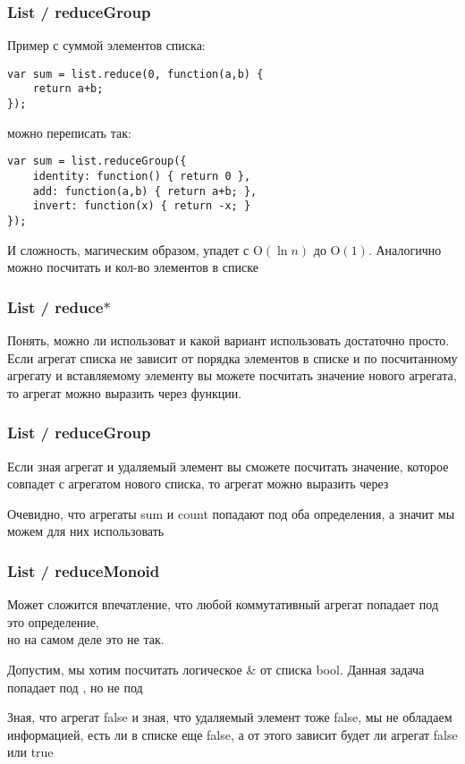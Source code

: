 \documentclass[xetex]{beamer}
\begin{document}
\begin{frame}[fragile]
\frametitle{List / reduceGroup}
Пример с суммой элементов списка:
\begin{lstlisting}[frame=none]
var sum = list.reduce(0, function(a,b) { 
    return a+b; 
});
\end{lstlisting}
можно переписать так:
\begin{lstlisting}[frame=none]
var sum = list.reduceGroup({
    identity: function() { return 0 },
    add: function(a,b) { return a+b; },
    invert: function(x) { return -x; }
});
\end{lstlisting}

\vspace{4mm}
И сложность, магическим образом, упадет с $\mathrm{O}(\ln n)$ до $\mathrm{O}(1)$. Аналогично можно посчитать и кол-во элементов в списке
\end{frame}


\begin{frame}[fragile]
\frametitle{List / reduce$\ast$}
Понять, можно ли использоват \quad и какой вариант использовать достаточно просто. Если агрегат списка не зависит от порядка элементов в списке и по посчитанному агрегату и вставляемому элементу вы можете посчитать значение нового агрегата, то агрегат можно выразить через \quad функции.
\end{frame}


\begin{frame}[fragile]
\frametitle{List / reduceGroup}
Если зная агрегат и удаляемый элемент вы сможете посчитать значение, которое совпадет с агрегатом нового списка, то агрегат можно выразить через 

\vspace{10mm}
Очевидно, что агрегаты sum и count попадают под оба определения, а значит мы можем для них использовать 
\end{frame}


\begin{frame}[fragile]
\frametitle{List / reduceMonoid}
Может сложится впечатление, что любой коммутативный агрегат попадает под это определение, \\ но на самом деле это не так. 

\vspace{6mm}
Допустим, мы хотим посчитать логическое \& от списка bool. Данная задача попадает под \quad, но не под 

\vspace{6mm}
{\color{comments-color} Зная, что агрегат false и зная, что удаляемый элемент тоже false, мы не обладаем информацией, есть ли в списке еще false, а от этого зависит будет ли агрегат false или true}
\end{frame}
\end{document}

